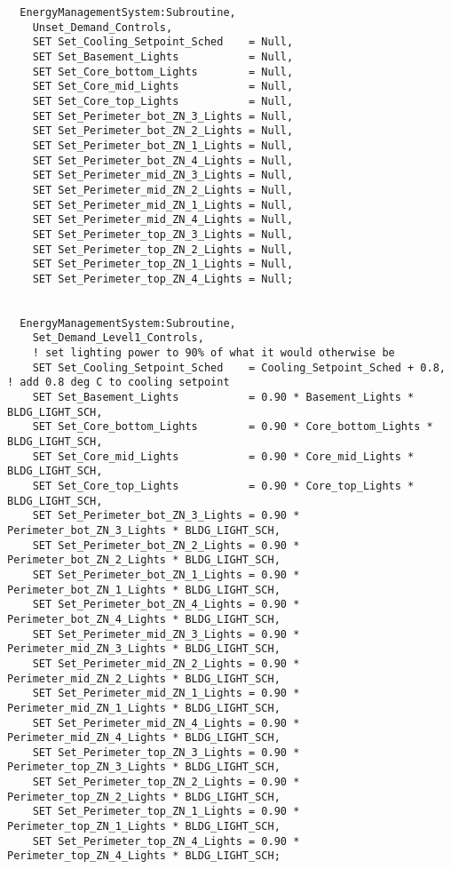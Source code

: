 \begin{lstlisting}
  EnergyManagementSystem:Subroutine,
    Unset_Demand_Controls,
    SET Set_Cooling_Setpoint_Sched    = Null,
    SET Set_Basement_Lights           = Null,
    SET Set_Core_bottom_Lights        = Null,
    SET Set_Core_mid_Lights           = Null,
    SET Set_Core_top_Lights           = Null,
    SET Set_Perimeter_bot_ZN_3_Lights = Null,
    SET Set_Perimeter_bot_ZN_2_Lights = Null,
    SET Set_Perimeter_bot_ZN_1_Lights = Null,
    SET Set_Perimeter_bot_ZN_4_Lights = Null,
    SET Set_Perimeter_mid_ZN_3_Lights = Null,
    SET Set_Perimeter_mid_ZN_2_Lights = Null,
    SET Set_Perimeter_mid_ZN_1_Lights = Null,
    SET Set_Perimeter_mid_ZN_4_Lights = Null,
    SET Set_Perimeter_top_ZN_3_Lights = Null,
    SET Set_Perimeter_top_ZN_2_Lights = Null,
    SET Set_Perimeter_top_ZN_1_Lights = Null,
    SET Set_Perimeter_top_ZN_4_Lights = Null;


  EnergyManagementSystem:Subroutine,
    Set_Demand_Level1_Controls,
    ! set lighting power to 90% of what it would otherwise be
    SET Set_Cooling_Setpoint_Sched    = Cooling_Setpoint_Sched + 0.8, ! add 0.8 deg C to cooling setpoint
    SET Set_Basement_Lights           = 0.90 * Basement_Lights * BLDG_LIGHT_SCH,
    SET Set_Core_bottom_Lights        = 0.90 * Core_bottom_Lights * BLDG_LIGHT_SCH,
    SET Set_Core_mid_Lights           = 0.90 * Core_mid_Lights * BLDG_LIGHT_SCH,
    SET Set_Core_top_Lights           = 0.90 * Core_top_Lights * BLDG_LIGHT_SCH,
    SET Set_Perimeter_bot_ZN_3_Lights = 0.90 * Perimeter_bot_ZN_3_Lights * BLDG_LIGHT_SCH,
    SET Set_Perimeter_bot_ZN_2_Lights = 0.90 * Perimeter_bot_ZN_2_Lights * BLDG_LIGHT_SCH,
    SET Set_Perimeter_bot_ZN_1_Lights = 0.90 * Perimeter_bot_ZN_1_Lights * BLDG_LIGHT_SCH,
    SET Set_Perimeter_bot_ZN_4_Lights = 0.90 * Perimeter_bot_ZN_4_Lights * BLDG_LIGHT_SCH,
    SET Set_Perimeter_mid_ZN_3_Lights = 0.90 * Perimeter_mid_ZN_3_Lights * BLDG_LIGHT_SCH,
    SET Set_Perimeter_mid_ZN_2_Lights = 0.90 * Perimeter_mid_ZN_2_Lights * BLDG_LIGHT_SCH,
    SET Set_Perimeter_mid_ZN_1_Lights = 0.90 * Perimeter_mid_ZN_1_Lights * BLDG_LIGHT_SCH,
    SET Set_Perimeter_mid_ZN_4_Lights = 0.90 * Perimeter_mid_ZN_4_Lights * BLDG_LIGHT_SCH,
    SET Set_Perimeter_top_ZN_3_Lights = 0.90 * Perimeter_top_ZN_3_Lights * BLDG_LIGHT_SCH,
    SET Set_Perimeter_top_ZN_2_Lights = 0.90 * Perimeter_top_ZN_2_Lights * BLDG_LIGHT_SCH,
    SET Set_Perimeter_top_ZN_1_Lights = 0.90 * Perimeter_top_ZN_1_Lights * BLDG_LIGHT_SCH,
    SET Set_Perimeter_top_ZN_4_Lights = 0.90 * Perimeter_top_ZN_4_Lights * BLDG_LIGHT_SCH;



\end{lstlisting}
